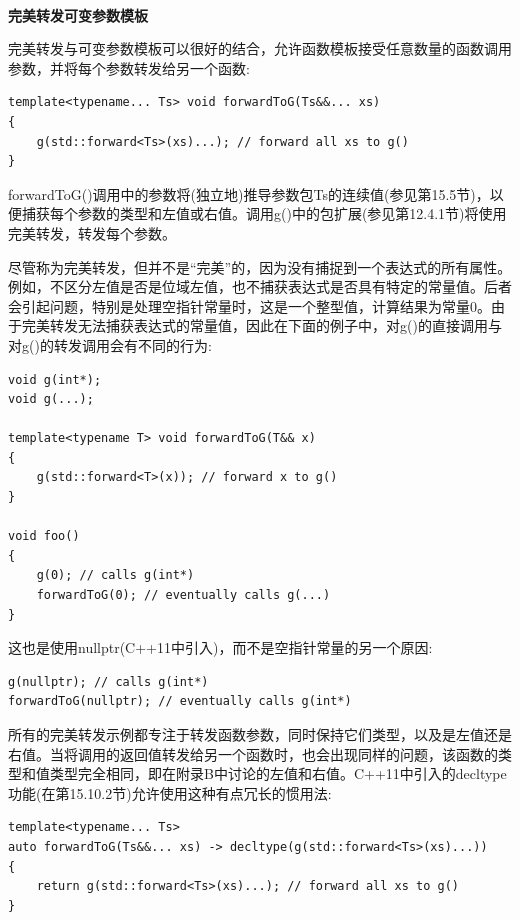 \hspace*{\fill} \\ %
\noindent
\textbf{完美转发可变参数模板}

完美转发与可变参数模板可以很好的结合，允许函数模板接受任意数量的函数调用参数，并将每个参数转发给另一个函数:

\begin{lstlisting}[style=styleCXX]
template<typename... Ts> void forwardToG(Ts&&... xs)
{
	g(std::forward<Ts>(xs)...); // forward all xs to g()
}
\end{lstlisting}

forwardToG()调用中的参数将(独立地)推导参数包Ts的连续值(参见第15.5节)，以便捕获每个参数的类型和左值或右值。调用g()中的包扩展(参见第12.4.1节)将使用完美转发，转发每个参数。

尽管称为完美转发，但并不是“完美”的，因为没有捕捉到一个表达式的所有属性。例如，不区分左值是否是位域左值，也不捕获表达式是否具有特定的常量值。后者会引起问题，特别是处理空指针常量时，这是一个整型值，计算结果为常量0。由于完美转发无法捕获表达式的常量值，因此在下面的例子中，对g()的直接调用与对g()的转发调用会有不同的行为:

\begin{lstlisting}[style=styleCXX]
void g(int*);
void g(...);

template<typename T> void forwardToG(T&& x)
{
	g(std::forward<T>(x)); // forward x to g()
}

void foo()
{
	g(0); // calls g(int*)
	forwardToG(0); // eventually calls g(...)
}
\end{lstlisting}

这也是使用nullptr(C++11中引入)，而不是空指针常量的另一个原因:

\begin{lstlisting}[style=styleCXX]
g(nullptr); // calls g(int*)
forwardToG(nullptr); // eventually calls g(int*)
\end{lstlisting}

所有的完美转发示例都专注于转发函数参数，同时保持它们类型，以及是左值还是右值。当将调用的返回值转发给另一个函数时，也会出现同样的问题，该函数的类型和值类型完全相同，即在附录B中讨论的左值和右值。C++11中引入的decltype功能(在第15.10.2节)允许使用这种有点冗长的惯用法:

\begin{lstlisting}[style=styleCXX]
template<typename... Ts>
auto forwardToG(Ts&&... xs) -> decltype(g(std::forward<Ts>(xs)...))
{
	return g(std::forward<Ts>(xs)...); // forward all xs to g()
}
\end{lstlisting}

